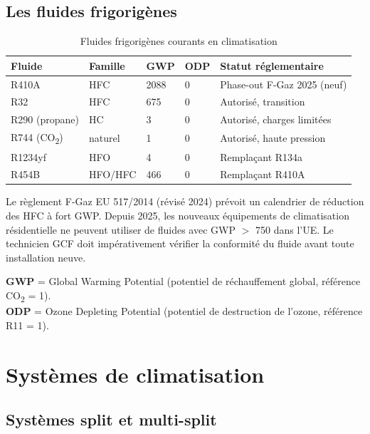 \subsection{Les fluides frigorigènes}

\begin{table}[H]
  \centering
  \caption{Fluides frigorigènes courants en climatisation}
  \begin{tabular}{p{2cm}p{2.5cm}p{1.5cm}p{1.5cm}p{4cm}}
    \toprule
    Fluide & Famille & GWP & ODP & Statut réglementaire \\
    \midrule
    R410A & HFC & 2088 & 0 & Phase-out F-Gaz 2025 (neuf) \\
    R32 & HFC & 675 & 0 & Autorisé, transition \\
    R290 (propane) & HC & 3 & 0 & Autorisé, charges limitées \\
    R744 (CO\textsubscript{2}) & naturel & 1 & 0 & Autorisé, haute pression \\
    R1234yf & HFO & 4 & 0 & Remplaçant R134a \\
    R454B & HFO/HFC & 466 & 0 & Remplaçant R410A \\
    \bottomrule
  \end{tabular}
\end{table}

\begin{attention}
Le règlement F-Gaz EU 517/2014 (révisé 2024) prévoit un calendrier de réduction des HFC à fort GWP. Depuis 2025, les nouveaux équipements de climatisation résidentielle ne peuvent utiliser de fluides avec GWP $>$ 750 dans l'UE. Le technicien GCF doit impérativement vérifier la conformité du fluide avant toute installation neuve.

\textbf{GWP} = Global Warming Potential (potentiel de réchauffement global, référence CO\textsubscript{2} = 1).\\
\textbf{ODP} = Ozone Depleting Potential (potentiel de destruction de l'ozone, référence R11 = 1).
\end{attention}

\section{Systèmes de climatisation}

\subsection{Systèmes split et multi-split}

